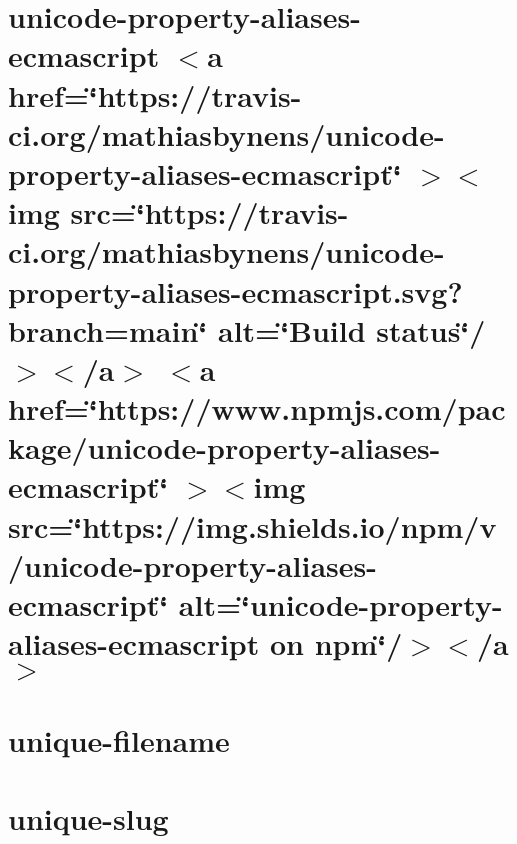 \documentclass[twoside]{book}
\newcommand{\+}{\discretionary{\mbox{\scriptsize$\hookleftarrow$}}{}{}}
\begin{document}
\chapter{unicode-\/property-\/aliases-\/ecmascript \texorpdfstring{$<$}{<}a href=\char`\"{}https\+://travis-\/ci.\+org/mathiasbynens/unicode-\/property-\/aliases-\/ecmascript\char`\"{} \texorpdfstring{$>$}{>}\texorpdfstring{$<$}{<}img src=\char`\"{}https\+://travis-\/ci.\+org/mathiasbynens/unicode-\/property-\/aliases-\/ecmascript.\+svg?branch=main\char`\"{} alt=\char`\"{}\+Build status\char`\"{}/\texorpdfstring{$>$}{>}\texorpdfstring{$<$}{<}/a\texorpdfstring{$>$}{>} \texorpdfstring{$<$}{<}a href=\char`\"{}https\+://www.\+npmjs.\+com/package/unicode-\/property-\/aliases-\/ecmascript\char`\"{} \texorpdfstring{$>$}{>}\texorpdfstring{$<$}{<}img src=\char`\"{}https\+://img.\+shields.\+io/npm/v/unicode-\/property-\/aliases-\/ecmascript\char`\"{} alt=\char`\"{}unicode-\/property-\/aliases-\/ecmascript on npm\char`\"{}/\texorpdfstring{$>$}{>}\texorpdfstring{$<$}{<}/a\texorpdfstring{$>$}{>}}
\label{md__c___users_vaishnavi_jadhav__desktop__developer_code_mean_stack_example_client_node_modules_u92bbd1f138a65502b53d72e649890d05}

\chapter{unique-\/filename}
\label{md__c___users_vaishnavi_jadhav__desktop__developer_code_mean_stack_example_client_node_modules_unique_filename__r_e_a_d_m_e}

\chapter{unique-\/slug}
\label{md__c___users_vaishnavi_jadhav__desktop__developer_code_mean_stack_example_client_node_modules_unique_slug__r_e_a_d_m_e}

\end{document}
